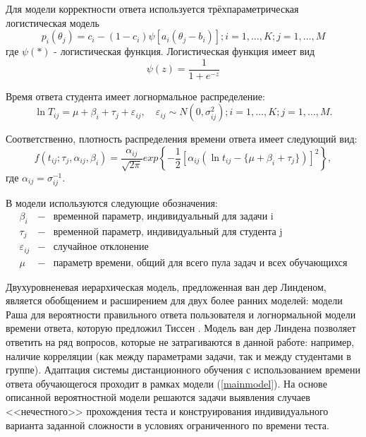 Для модели кор\-ректности ответа используется трёхпараметрическая ло\-гистическая модель
\begin{equation}
p_i(\theta_j) = c_i - (1-c_i)\psi[a_i(\theta_j - b_i)]; i=1,\ldots,K; j=1,\ldots,M
\end{equation}
где $\psi( * )$ - логистическая функция. Логистическая функция имеет вид
$$
\psi(z) = \frac{1}{1+e^{-z}}
$$

Время ответа студента имеет логнормальное распределение:
\label{mvonu}
\begin{equation}
\label{mainmodel}
\ln T_{ij} = \mu + \beta_i + \tau_j + \varepsilon_{ij},\quad \varepsilon_{ij} \sim N(0,\sigma^{2}_{ij}); i=1,\ldots,K; j=1,\ldots,M.
\end{equation}

Соответственно, плотность распределения времени ответа имеет следу\-ющий вид:
\begin{equation}
f(t_{ij};\tau_j,\alpha_{ij},\beta_i) = \frac{\alpha_{ij}}{\sqrt{2\pi}}exp\left\{ -\frac{1}{2}[\alpha_{ij}(\ln t_{ij} - \{\mu + \beta_i + \tau_j\})]^2 \right\},
\end{equation}
где $\alpha_{ij} = \sigma_{ij}^{-1}$.

В модели используются следующие обозначения:
$$
\begin{array}{lll}
\beta_i &-& \mbox{временной параметр, индивидуальный для задачи i}\\
\tau_j &-& \mbox{временной параметр, индивидуальный для студента j }  \\
\varepsilon_{ij} &-& \mbox{случайное отклонение}\\
\mu &-& \mbox{параметр времени, общий для всего пула задач и всех обучающихся}
\end{array}
$$

Двухуровненевая иерархическая модель, предложенная ван дер Линденом, является обобщением и расширением для двух более ранних моделей: модели Раша \cite{22.} для вероятности правильного ответа пользователя и логнормальной модели времени ответа, которую предложил Тиссен \cite{21.}. Модель ван дер Линдена позволяет ответить на ряд вопросов, которые не затрагиваются  в данной работе: например, наличие корреляции (как между параметрами задачи, так и между студентами в группе). Адаптация системы дистанционного обучения с использованием времени ответа обучающегося проходит  в рамках модели (\ref{mainmodel}). На основе описанной вероятностной модели решаются задачи выявления случаев <<нечестного>> прохождения теста и конструирования инди\-видуального варианта заданной сложности в условиях ограниченного по вре\-мени теста.

